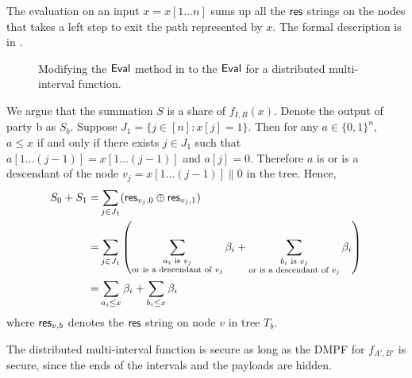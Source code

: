 The evaluation on an input $x = x[1\dots n]$ sums up all the ${\sf res}$ strings on the nodes that takes a left step to exit the path represented by $x$. The formal description is in . 
\begin{figure}
  \caption{Modifying the ${\sf Eval}$ method in  to the ${\sf Eval}$ for a distributed multi-interval function. }
  \label{fig:multi-interval_eval}
\end{figure}
We argue that the summation $S$ is a share of $f_{I,B}(x)$. Denote the output of party b as $S_b$. Suppose $J_1 = \{j\in[n]:x[j]=1\}$. Then for any $a\in \{0,1\}^n$, $a\le x$ if and only if there exists $j\in J_1$ such that $a[1\dots(j-1)] = x[1\dots (j-1)]$ and $a[j] = 0$. Therefore $a$ is or is a descendant of the node $v_j = x[1\dots (j-1)]\|0$ in the tree. Hence, 
\[
  \begin{split}
    S_0 + S_1 =& \sum_{j\in J_1} ({\sf res}_{v_j, 0}\oplus{\sf res}_{v_j,1})\\
    =& \sum_{j\in J_1} \left(\sum_{\substack{a_i\text{ is }v_j\\\text{or is a descendant of }v_j}}\beta_i +\sum_{\substack{b_i\text{ is }v_j\\\text{or is a descendant of }v_j}}\beta_i\right)\\
    =&\sum_{a_i\le x}\beta_i + \sum_{b_i\le x}\beta_i
  \end{split}
\]
where ${\sf res}_{v,b}$ denotes the ${\sf res}$ string on node $v$ in tree $T_b$. 

The distributed multi-interval function is secure as long as the DMPF for $f_{A',B'}$ is secure, since the ends of the intervals and the payloads are hidden. 

